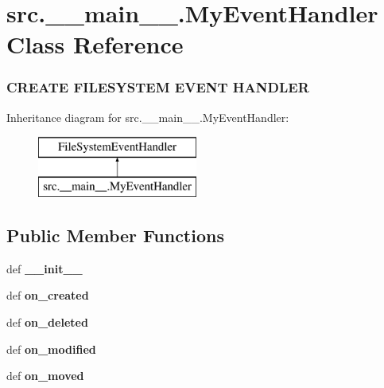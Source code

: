 \hypertarget{classsrc_1_1____main_____1_1_my_event_handler}{\section{src.\-\_\-\-\_\-main\-\_\-\-\_\-.\-My\-Event\-Handler Class Reference}
\label{classsrc_1_1____main_____1_1_my_event_handler}
}




 \subsubsection*{C\-R\-E\-A\-T\-E F\-I\-L\-E\-S\-Y\-S\-T\-E\-M E\-V\-E\-N\-T H\-A\-N\-D\-L\-E\-R } 


Inheritance diagram for src.\-\_\-\-\_\-main\-\_\-\-\_\-.\-My\-Event\-Handler\-:\begin{figure}[H]
\begin{center}
\leavevmode
\includegraphics[height=2.000000cm]{classsrc_1_1____main_____1_1_my_event_handler}
\end{center}
\end{figure}
\subsection*{Public Member Functions}
\begin{DoxyCompactItemize}
\item 
\hypertarget{classsrc_1_1____main_____1_1_my_event_handler_a65873e108187474f10c5edc4cf58051d}{def {\bfseries \-\_\-\-\_\-init\-\_\-\-\_\-}}\label{classsrc_1_1____main_____1_1_my_event_handler_a65873e108187474f10c5edc4cf58051d}

\item 
\hypertarget{classsrc_1_1____main_____1_1_my_event_handler_a601600b8fc80783b92efb7729def7b99}{def {\bfseries on\-\_\-created}}\label{classsrc_1_1____main_____1_1_my_event_handler_a601600b8fc80783b92efb7729def7b99}

\item 
\hypertarget{classsrc_1_1____main_____1_1_my_event_handler_a87c6af0c4ed396bfd9f1532ee2e52fdd}{def {\bfseries on\-\_\-deleted}}\label{classsrc_1_1____main_____1_1_my_event_handler_a87c6af0c4ed396bfd9f1532ee2e52fdd}

\item 
\hypertarget{classsrc_1_1____main_____1_1_my_event_handler_add6f4372401415fe377688acf35fd6db}{def {\bfseries on\-\_\-modified}}\label{classsrc_1_1____main_____1_1_my_event_handler_add6f4372401415fe377688acf35fd6db}

\item 
\hypertarget{classsrc_1_1____main_____1_1_my_event_handler_ab6e207b1d506c9002f68076cc54710a3}{def {\bfseries on\-\_\-moved}}\label{classsrc_1_1____main_____1_1_my_event_handler_ab6e207b1d506c9002f68076cc54710a3}

\end{DoxyCompactItemize}

